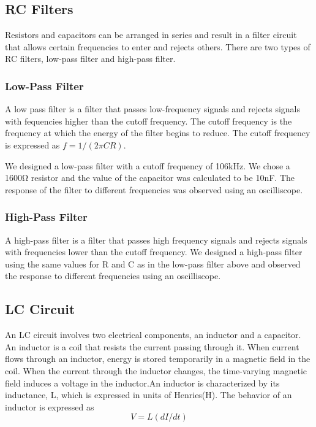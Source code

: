 \documentclass[12pt]{article}
\begin{document}
\subsection {RC Filters}
Resistors and capacitors can be arranged in series and result in a
filter circuit that allows certain frequencies to enter and rejects
others. There are two types of RC filters, low-pass filter and high-pass
filter. 

\subsubsection {Low-Pass Filter}
A low pass filter is a filter that passes low-frequency signals and
rejects signals with fequencies higher than the cutoff frequency. The
cutoff frequency is the frequency at which the energy of the filter
begins to reduce. The cutoff frequency is expressed as $f = 1/(2\pi CR)$.

We designed a low-pass filter with a cutoff frequency of 106kHz. We
chose a 1600Ω resistor and the value of the capacitor was calculated to
be 10nF. The response of the filter to different frequencies was
observed using an oscilliscope.
 

\subsubsection {High-Pass Filter}
A high-pass filter is a filter that passes high frequency signals and
rejects signals with frequencies lower than the cutoff frequency. We
designed a high-pass filter using the same values for R and C as in the
low-pass filter above and observed the response to different frequencies
using an oscilliscope.

\subsection {LC Circuit}
An LC circuit involves two electrical components, an inductor and a
capacitor. An inductor is a coil that resists the current passing
through it. When current flows through an inductor, energy is stored
temporarily in a magnetic field in the coil. When the current through
the inductor changes, the time-varying magnetic field induces a voltage
in the inductor.An inductor is characterized by its inductance, L, which
is expressed in units of Henries(H). The behavior of an inductor is
expressed as  
\begin{equation}
V = L(dI/dt)
\end{equation}
\end{document}
